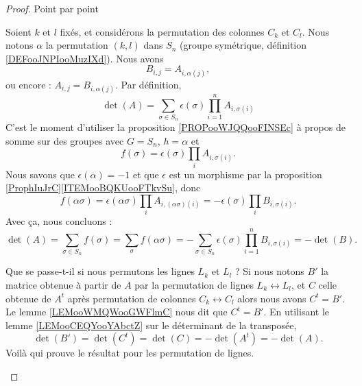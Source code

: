 \begin{proof}
	Point par point
	\begin{subproof}

		Soient \( k\) et \( l\) fixés, et considérons la permutation des colonnes \( C_k\) et \( C_l\). Nous notons \( \alpha\) la permutation \( (k,l)\) dans \( S_n\) (groupe symétrique, définition \ref{DEFooJNPIooMuzIXd}). Nous avons
		\begin{equation}
			B_{i,j}=A_{i,\alpha(j)},
		\end{equation}
		ou encore : \( A_{i,j}=B_{i,\alpha(j)}\). Par définition,
		\begin{equation}
			\det(A)=\sum_{\sigma\in S_{n}}\epsilon(\sigma)\prod_{i=1}^n A_{i,\sigma(i)}
		\end{equation}
		C'est le moment d'utiliser la proposition \ref{PROPooWJQQooFINSEc} à propos de somme sur des groupes avec \( G=S_n\), \( h=\alpha\) et
		\begin{equation}
			f(\sigma)=\epsilon(\sigma)\prod_iA_{i,\sigma(i)}.
		\end{equation}
		Nous savons que \( \epsilon(\alpha)=-1\) et que \( \epsilon\) est un morphisme par la proposition \ref{ProphIuJrC}\ref{ITEMooBQKUooFTkvSu}, donc
		\begin{equation}
			f(\alpha \sigma)=\epsilon(\alpha\sigma)\prod_iA_{i,(\alpha\sigma)(i)}=-\epsilon(\sigma)\prod_iB_{i,\sigma(i)}.
		\end{equation}
		Avec ça, nous concluons :
		\begin{equation}
			\det(A)=\sum_{\sigma\in S_n}f(\sigma)=\sum_{\sigma}f(\alpha \sigma)=-\sum_{\sigma\in S_n}\epsilon(\sigma)\prod_{i=1}^n B_{i,\sigma(i)}=-\det(B).
		\end{equation}

		Que se passe-t-il si nous permutons les lignes \( L_k\) et \( L_{l}\) ? Si nous notons \( B'\) la matrice obtenue à partir de \( A\) par la permutation de lignes \( L_k\leftrightarrow L_l\), et \( C\) celle obtenue de \( A^t\) après permutation de colonnes \( C_k\leftrightarrow C_l\) alors nous avons \( C^t=B'\). Le lemme \ref{LEMooWMQWooGWFlmC} nous dit que \( C^t=B'\). En utilisant le lemme \ref{LEMooCEQYooYAbctZ} sur le déterminant de la transposée,
		\begin{equation}
			\det(B')=\det(C^t)=\det(C)=-\det(A^t)=-\det(A).
		\end{equation}
		Voilà qui prouve le résultat pour les permutation de lignes.


\end{subproof}
\end{proof}
